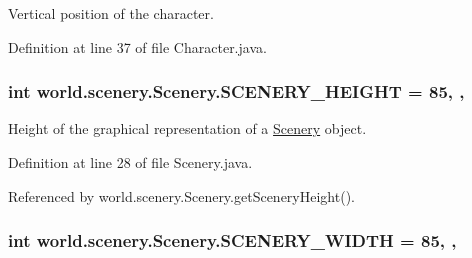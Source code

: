 Vertical position of the character. 



Definition at line 37 of file Character.\-java.

\hypertarget{classworld_1_1scenery_1_1_scenery_a106e53ae6e1647395740237ccce7f363}{
\subsubsection[{S\-C\-E\-N\-E\-R\-Y\-\_\-\-H\-E\-I\-G\-H\-T}]{\setlength{\rightskip}{0pt plus 5cm}int world.\-scenery.\-Scenery.\-S\-C\-E\-N\-E\-R\-Y\-\_\-\-H\-E\-I\-G\-H\-T = 85\hspace{0.3cm}{\ttfamily [static]}, {\ttfamily [protected]}, {\ttfamily [inherited]}}}\label{classworld_1_1scenery_1_1_scenery_a106e53ae6e1647395740237ccce7f363}


Height of the graphical representation of a \hyperlink{classworld_1_1scenery_1_1_scenery}{Scenery} object. 



Definition at line 28 of file Scenery.\-java.



Referenced by world.\-scenery.\-Scenery.\-get\-Scenery\-Height().

\hypertarget{classworld_1_1scenery_1_1_scenery_affb047c028883c6d069a03ef0f1caeb8}{
\subsubsection[{S\-C\-E\-N\-E\-R\-Y\-\_\-\-W\-I\-D\-T\-H}]{\setlength{\rightskip}{0pt plus 5cm}int world.\-scenery.\-Scenery.\-S\-C\-E\-N\-E\-R\-Y\-\_\-\-W\-I\-D\-T\-H = 85\hspace{0.3cm}{\ttfamily [static]}, {\ttfamily [protected]}, {\ttfamily [inherited]}}}\label{classworld_1_1scenery_1_1_scenery_affb047c028883c6d069a03ef0f1caeb8}


